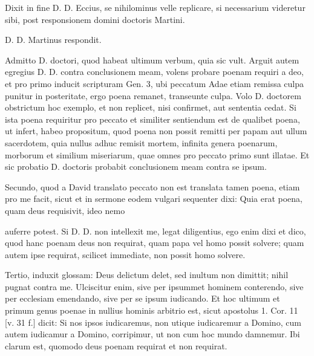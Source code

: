 Dixit in fine D. D. Eccius, se nihilominus velle replicare, si necessarium videretur sibi, post responsionem domini doctoris Martini.

D. D. Martinus respondit.

Admitto D. doctori, quod habeat ultimum verbum, quia sic vult. Arguit autem egregius D. D. contra conclusionem meam, volens probare poenam requiri a deo, et pro primo inducit scripturam Gen. 3, ubi peccatum Adae etiam remissa culpa punitur in posteritate, ergo poena remanet, transeunte culpa. Volo D. doctorem obstrictum hoc exemplo, et non replicet, nisi confirmet, aut sententia cedat. Si ista poena requiritur pro peccato et similiter sentiendum est de qualibet poena, ut infert, habeo propositum, quod poena non possit remitti per papam aut ullum sacerdotem, quia nullus adhuc remisit mortem, infinita genera poenarum, morborum et similium miseriarum, quae omnes pro peccato primo sunt illatae. Et sic probatio D. doctoris probabit conclusionem meam contra se ipsum.

Secundo, quod a David translato peccato non est translata tamen poena, etiam pro me facit, sicut et in sermone eodem vulgari sequenter dixi: Quia erat poena, quam deus requisivit, ideo nemo

auferre potest. Si D. D. non intellexit me, legat diligentius, ego enim dixi et dico, quod hanc poenam deus non requirat, quam papa vel homo possit solvere; quam autem ipse requirat, scilicet immediate, non possit homo solvere.

Tertio, induxit glossam: Deus delictum delet, sed inultum non dimittit; nihil pugnat contra me. Ulciscitur enim, sive per ipsummet hominem conterendo, sive per ecclesiam emendando, sive per se ipsum iudicando. Et hoc ultimum et primum genus poenae in nullius hominis arbitrio est, sicut apostolus 1. Cor. 11 [v. 31 f.] dicit: Si nos ipsos iudicaremus, non utique iudicaremur a Domino, cum autem iudicamur a Domino, corripimur, ut non cum hoc mundo damnemur. Ibi clarum est, quomodo deus poenam requirat et non requirat.

